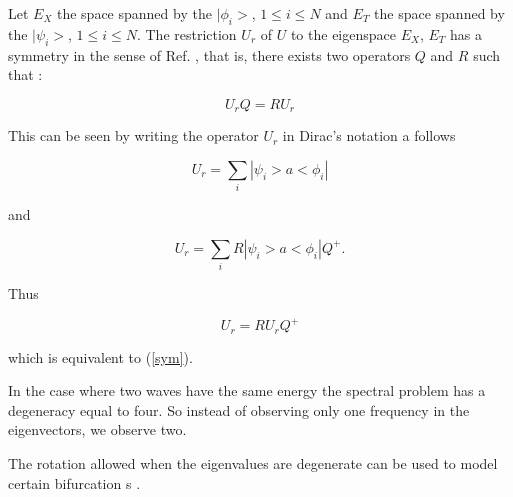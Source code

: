 \begin{rem}
Let  $E_X$ the space spanned by the $|\phi_i>$, $1\leq i \leq N$ and
$E_T$ the space spanned by the $|\psi_i>$, $1\leq i \leq N$.
The restriction $U_r$ of $U$ to the eigenspace $E_X$, $E_T$
has a symmetry in the sense of Ref. \cite{LimaSym}, 
that is, there exists
two operators $Q$ and $R$ such that :

 
\begin{equation}
U_r Q=R U_r
\label{sym}
\end{equation}
 
This can be seen by writing the operator $U_r$ in 
Dirac's notation a follows

\begin{equation}
U_r=\sum_i|\psi_i>a<\phi_i|
\end{equation}
 
and
 
\begin{equation}
U_r=\sum_i R|\psi_i>a<\phi_i|Q^+.
\end{equation}
 
Thus
 
\begin{equation}
U_r=R U_r Q^+
\end{equation}
 
which is equivalent to (\ref{sym}).

\end{rem}
In the case where two waves have the same energy the
spectral problem has a degeneracy equal to four.
So instead of observing  only one
frequency in the eigenvectors, we observe two.


\begin{rem}
The rotation allowed when the eigenvalues
are degenerate can be used to model certain bifurcation s
\cite{LimaSym,LimaMod}.
\end{rem}



